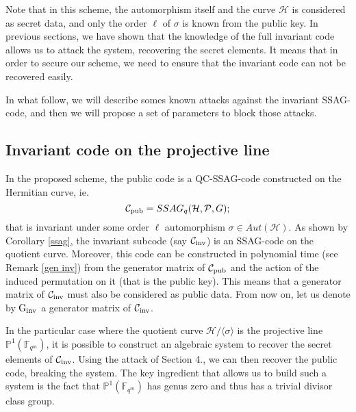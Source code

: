 \documentclass[10pt]{article}
\newcommand{\s}{\vspace{0.3cm}}
\newcommand{\C}{\mathcal{C}}
\newcommand{\PP}{\mathbb{P}}
\newcommand{\fqm}{\mathbb{F}_{q^m}}
\newcommand{\PR}{\mathcal{P}}
\begin{document}
\s

Note that in this scheme, the automorphism itself and the curve $\mathcal{H}$ is considered as secret data, and only the order $\ell$ of $\sigma$ is known from the public key. In previous sections, we have shown that the knowledge of the full invariant code allows us to attack the system, recovering the secret elements. It means that in order to secure our scheme, we need to ensure that the invariant code can not be recovered easily. 

\s

In what follow, we will describe somes known attacks against the invariant SSAG-code, and then we will propose a set of parameters to block those attacks.

\s

\subsection{Invariant code on the projective line}

\s

In the proposed scheme, the public code is a QC-SSAG-code constructed on the Hermitian curve, ie. 
\[\mathcal{C}_{\rm pub} = SSAG_q(\mathcal{H},\PR,G);\]
that is invariant under some order $\ell$ automorphism $\sigma \in Aut(\mathcal{H})$. As shown by Corollary \ref{ssag}, the invariant subcode (say $\mathcal{C}_{\rm inv}$) is an SSAG-code on the quotient curve. Moreover, this code can be constructed in polynomial time (see Remark \ref{gen inv}) from the generator matrix of $\mathcal{C}_{\rm pub}$ and the action of the induced permutation on it (that is the public key). This means that a generator matrix of $\C_{\rm inv}$ must also be considered as public data. From now on, let us denote by $\rm G_{inv}$ a generator matrix of $\mathcal{C}_{\rm inv}$.  

\s

In the particular case where the quotient curve $\mathcal{H}/\langle\sigma\rangle$ is the projective line $\PP^1(\fqm)$, it is possible to construct an algebraic system to recover the secret elements of $\C_{\rm inv}$. Using the attack of Section 4., we can then recover the public code, breaking the system. The key ingredient that allows us to build such a system is the fact that $\PP^1(\fqm)$ has genus zero and thus has a trivial divisor class group. 

\s
\end{document}
